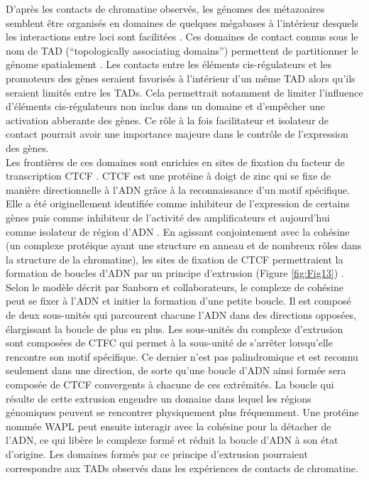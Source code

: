 D’après les contacts de chromatine observés, les génomes des métazoaires semblent être organisés en domaines de quelques mégabases à l’intérieur desquels les interactions entre loci sont facilitées \citep{sexton_role_2015, dixon_topological_2012, rao_3d_2014}. Ces domaines de contact connus sous le nom de \acrshort{TAD} (“topologically associating domains”) permettent de partitionner le génome spatialement \citep{symmons_functional_2014}. Les contacts entre les éléments \gls{cis}-régulateurs et les promoteurs des gènes seraient favorisés à l’intérieur d’un même \acrshort{TAD} alors qu’ils seraient limités entre les \acrshort{TAD}s. Cela permettrait notamment de limiter l’influence d’éléments \gls{cis}-régulateurs non inclus dans un domaine et d’empêcher une activation abberante des gènes. Ce rôle à la fois facilitateur et isolateur de contact pourrait avoir une importance majeure dans le contrôle de l’expression des gènes. \\

Les frontières de ces domaines sont enrichies en sites de fixation du facteur de transcription CTCF \citep{vietrirudan_comparative_2015}. CTCF est une protéine à doigt de zinc qui se fixe de manière directionnelle à l’ADN grâce à la reconnaissance d’un motif spécifique. Elle a été originellement identifiée comme inhibiteur de l’expression de certains gènes \citep{filippova_exceptionally_1996} puis comme inhibiteur de l’activité des \glspl{amplificateur} et aujourd’hui comme isolateur de région d'\acrshort{ADN} \citep{bell_protein_1999}. En agissant conjointement avec la cohésine (un complexe protéique ayant une structure en anneau et de nombreux rôles dans la structure de la chromatine), les sites de fixation de CTCF permettraient la formation de boucles d’ADN par un principe d’extrusion (Figure \ref{fig:Fig13}) \citep{sanborn_chromatin_2015}. Selon le modèle décrit par Sanborn et collaborateurs, le complexe de cohésine peut se fixer à l’ADN et initier la formation d’une petite boucle. Il est composé de deux sous-unités qui parcourent chacune l’ADN dans des directions opposées, élargissant la boucle de plus en plus. Les sous-unités du complexe d’extrusion sont composées de CTFC qui permet à la sous-unité de s’arrêter lorsqu’elle rencontre son motif spécifique. Ce dernier n’est pas palindromique et est reconnu seulement dans une direction, de sorte qu’une boucle d’ADN ainsi formée sera composée de CTCF convergents à chacune de ces extrémités. La boucle qui résulte de cette extrusion engendre un domaine dans lequel les régions génomiques peuvent se rencontrer physiquement plus fréquemment. Une protéine nommée WAPL peut ensuite interagir avec la cohésine pour la détacher de l’ADN, ce qui libère le complexe formé et réduit la boucle d’ADN à son état d’origine. Les domaines formés par ce principe d’extrusion pourraient correspondre aux \acrshort{TAD}s observés dans les expériences de contacts de chromatine. \\

